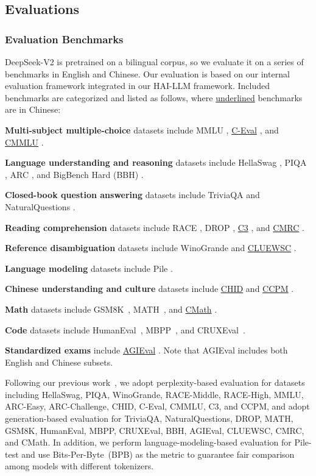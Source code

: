 \documentclass[11pt, a4paper, logo, copyright, nonumbering]{deepseek}
\newcommand{\dsvii}{DeepSeek-V2}
\begin{document}
\begin{CJK*}{UTF8}{gbsn}
\subsection{Evaluations}

\subsubsection{Evaluation Benchmarks}

\dsvii{} is pretrained on a bilingual corpus, so we evaluate it on a series of benchmarks in English and Chinese.
Our evaluation is based on our internal evaluation framework integrated in our HAI-LLM framework. 
Included benchmarks are categorized and listed as follows, where \underline{underlined} benchmarks are in Chinese:

\textbf{Multi-subject multiple-choice} datasets include MMLU \citep{mmlu}, \underline{C-Eval} \citep{ceval}, and \underline{CMMLU} \citep{cmmlu}.

\textbf{Language understanding and reasoning} datasets include HellaSwag \citep{hellaswag}, PIQA \citep{piqa}, ARC \citep{arc}, and BigBench Hard (BBH) \citep{bbh}.

\textbf{Closed-book question answering} datasets include TriviaQA \citep{joshi-etal-2017-triviaqa} and NaturalQuestions \citep{naturalquestions}.

\textbf{Reading comprehension} datasets include RACE \cite{race}, DROP \citep{drop}, \underline{C3} \citep{sun2019investigating}, and \underline{CMRC} \citep{cui-etal-2019-span}.

\textbf{Reference disambiguation} datasets include WinoGrande \cite{sakaguchi2019winogrande} and \underline{CLUEWSC} \citep{clue}.

\textbf{Language modeling} datasets include Pile \citep{pile}.

\textbf{Chinese understanding and culture} datasets include \underline{CHID} \citep{chid} and \underline{CCPM} \citep{li2021ccpm}.

\textbf{Math} datasets include GSM8K~\citep{gsm8k}, MATH~\citep{hendrycks2021measuring}, and \underline{CMath} \citep{wei2023cmath}.

\textbf{Code} datasets include HumanEval~\citep{codex}, MBPP~\citep{mbpp}, and CRUXEval~\citep{gu2024cruxeval}.

\textbf{Standardized exams} include \underline{AGIEval} \citep{agieval}. 
Note that AGIEval includes both English and Chinese subsets.

Following our previous work~\citep{deepseek1}, we adopt perplexity-based evaluation for datasets including HellaSwag, PIQA, WinoGrande, RACE-Middle, RACE-High, MMLU, ARC-Easy, ARC-Challenge, CHID, C-Eval, CMMLU, C3, and CCPM, and adopt generation-based evaluation for TriviaQA, NaturalQuestions, DROP, MATH, GSM8K, HumanEval, MBPP, CRUXEval, BBH, AGIEval, CLUEWSC, CMRC, and CMath. 
In addition, we perform language-modeling-based evaluation for Pile-test and use Bits-Per-Byte~(BPB) as the metric to guarantee fair comparison among models with different tokenizers. 


\end{CJK*}
\end{document}
